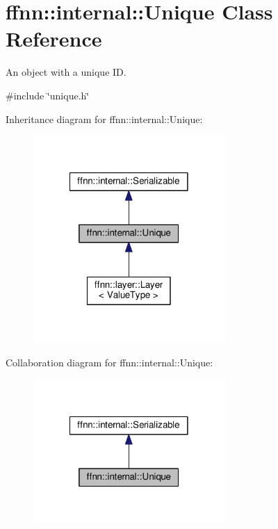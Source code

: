 \hypertarget{classffnn_1_1internal_1_1_unique}{\section{ffnn\-:\-:internal\-:\-:Unique Class Reference}
\label{classffnn_1_1internal_1_1_unique}
}


An object with a unique I\-D.  




{\ttfamily \#include \char`\"{}unique.\-h\char`\"{}}



Inheritance diagram for ffnn\-:\-:internal\-:\-:Unique\-:
\nopagebreak
\begin{figure}[H]
\begin{center}
\leavevmode
\includegraphics[width=206pt]{classffnn_1_1internal_1_1_unique__inherit__graph}
\end{center}
\end{figure}


Collaboration diagram for ffnn\-:\-:internal\-:\-:Unique\-:\nopagebreak
\begin{figure}[H]
\begin{center}
\leavevmode
\includegraphics[width=206pt]{classffnn_1_1internal_1_1_unique__coll__graph}
\end{center}
\end{figure}

